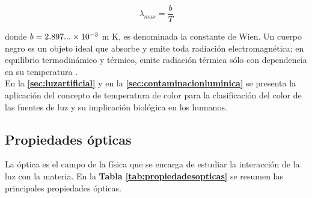\begin{equation}
\lambda_{max} = \dfrac{b}{T}
\end{equation}

donde $b = 2.897...\times 10^{-3}$ m K, es denominada la constante de Wien. Un cuerpo negro es un objeto ideal que absorbe y emite toda radiación electromagnética; en equilibrio termodinámico y térmico, emite radiación térmica sólo con dependencia en su temperatura \citep{Halliday&Resnick2008}.\\

En la \textbf{\autoref{sec:luzartificial}} y en la \textbf{\autoref{sec:contaminacionluminica}} se presenta la aplicación del concepto de temperatura de color para la clasificación del color de las fuentes de luz y su implicación biológica en los humanos.\\

\subsection{Propiedades ópticas}

La óptica es el campo de la física que se encarga de estudiar la interacción de la luz con la materia. En la  \textbf{Tabla \ref{tab:propiedadesopticas}} se resumen las principales propiedades ópticas.

\begin{table}[]
\centering
\caption{Propiedades ópticas de la luz  \citep{Born&Wolf2003}}
\label{tab:propiedadesopticas}
\end{table}

